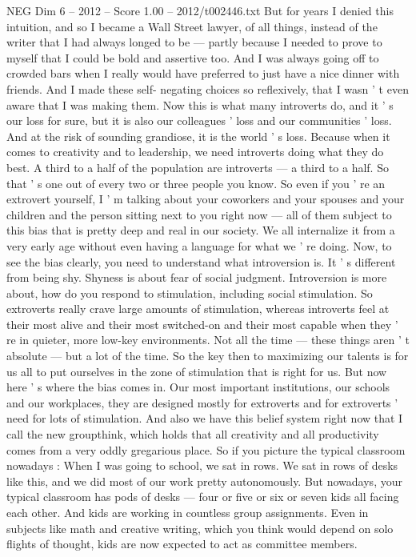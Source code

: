 \begin{textsample}{NEG Dim 6 – 2012 – Score 1.00 – 2012/t002446.txt}
But for years I denied this intuition, and so I became a Wall Street lawyer, of all things, instead of the writer that I had always longed to be — partly because I needed to prove to myself that I could be bold and assertive too.
And I was always going off to crowded bars when I really would have preferred to just have a nice dinner with friends.
And I made these self- negating choices so reflexively, that I wasn ' t even aware that I was making them.
Now this is what many introverts do, and it ' s our loss for sure, but it is also our colleagues ' loss and our communities ' loss.
And at the risk of sounding grandiose, it is the world ' s loss.
Because when it comes to creativity and to leadership, we need introverts doing what they do best.
A third to a half of the population are introverts — a third to a half.
So that ' s one out of every two or three people you know.
So even if you ' re an extrovert yourself, I ' m talking about your coworkers and your spouses and your children and the person sitting next to you right now — all of them subject to this bias that is pretty deep and real in our society.
We all internalize it from a very early age without even having a language for what we ' re doing.
Now, to see the bias clearly, you need to understand what introversion is.
It ' s different from being shy.
Shyness is about fear of social judgment.
Introversion is more about, how do you respond to stimulation, including social stimulation.
So extroverts really crave large amounts of stimulation, whereas introverts feel at their most alive and their most switched-on and their most capable when they ' re in quieter, more low-key environments.
Not all the time — these things aren ' t absolute — but a lot of the time.
So the key then to maximizing our talents is for us all to put ourselves in the zone of stimulation that is right for us.
But now here ' s where the bias comes in.
Our most important institutions, our schools and our workplaces, they are designed mostly for extroverts and for extroverts ' need for lots of stimulation.
And also we have this belief system right now that I call the new groupthink, which holds that all creativity and all productivity comes from a very oddly gregarious place.
So if you picture the typical classroom nowadays : When I was going to school, we sat in rows.
We sat in rows of desks like this, and we did most of our work pretty autonomously.
But nowadays, your typical classroom has pods of desks — four or five or six or seven kids all facing each other.
And kids are working in countless group assignments.
Even in subjects like math and creative writing, which you think would depend on solo flights of thought, kids are now expected to act as committee members.

\end{textsample}
